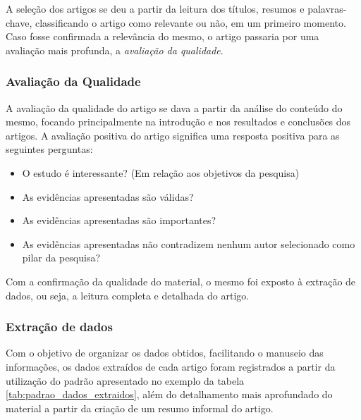 			A seleção dos artigos se deu a partir da leitura dos títulos, resumos e palavras-chave, classificando o artigo como relevante ou não, em um primeiro momento. Caso fosse confirmada a relevância do mesmo, o artigo passaria por uma avaliação mais profunda, a \textit{avaliação da qualidade}.


		\subsubsection{Avaliação da Qualidade}

			A avaliação da qualidade do artigo se dava a partir da análise do conteúdo do mesmo, focando principalmente na introdução e nos resultados e conclusões dos artigos. A avaliação positiva do artigo significa uma resposta positiva para as seguintes perguntas:

			\begin{itemize}
				\item O estudo é interessante? (Em relação aos objetivos da pesquisa)
				\item As evidências apresentadas são válidas?
				\item As evidências apresentadas são importantes?
				\item As evidências apresentadas não contradizem nenhum autor selecionado como pilar da pesquisa?
			\end{itemize}

			Com a confirmação da qualidade do material, o mesmo foi exposto à extração de dados, ou seja, a leitura completa e detalhada do artigo.

		\subsubsection{Extração de dados}

			Com o objetivo de organizar os dados obtidos, facilitando o manuseio das informações, os dados extraídos de cada artigo foram registrados a partir da utilização do padrão apresentado no exemplo da tabela \ref{tab:padrao_dados_extraidos}, além do detalhamento mais aprofundado do material a partir da criação de um resumo informal do artigo.

